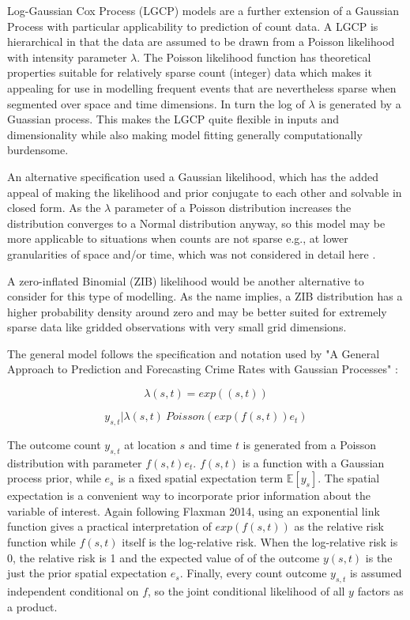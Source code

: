 \documentclass{article}
\begin{document}
Log-Gaussian Cox Process (LGCP) models are a further extension of a Gaussian Process with particular applicability to prediction of count data. A LGCP is hierarchical in that the data are assumed to be drawn from a Poisson likelihood with intensity parameter $\lambda$. The Poisson likelihood function has theoretical properties suitable for relatively sparse count (integer) data which makes it appealing for use in modelling frequent events that are nevertheless sparse when segmented over space and time dimensions. In turn the log of $\lambda$  is generated by a Guassian process\cite{teng_2017}. This makes the LGCP quite flexible in inputs and dimensionality while also making model fitting generally computationally burdensome. \par

An alternative specification used a Gaussian likelihood, which has the added appeal of making the likelihood and prior conjugate to each other and solvable in closed form. As the $\lambda$ parameter of a Poisson distribution increases the distribution converges to a Normal distribution anyway, so this model may be more applicable to situations when counts are not sparse e.g., at lower granularities of space and/or time, which was not considered in detail here .

A zero-inflated Binomial (ZIB) likelihood would be another alternative to consider for this type of modelling. As the name implies, a ZIB distribution has a higher probability density around zero and may be better suited for extremely sparse data like gridded observations with very small grid dimensions.

 The general model follows the specification and notation used by "A General Approach to Prediction and Forecasting Crime Rates with Gaussian Processes" \cite{flaxman_2014}: \par


$$\lambda(s,t) = exp((s,t))$$

$$ y_{s,t} | \lambda(s,t) ~ Poisson(exp(f(s,t))e_t) $$

The outcome count $y_{s,t}$ at location $s$ and time $t$ is generated from a Poisson distribution with parameter $f(s,t)e_t$. $f(s,t)$ is a function with a Gaussian process prior, while $e_s$ is a fixed spatial expectation term $\mathbb{E}[y_s]$. The spatial expectation is a convenient way to incorporate prior information about the variable of interest. Again following Flaxman 2014, using an exponential link function gives a practical interpretation of $exp(f(s,t))$ as the relative risk function while $f(s,t)$ itself is the log-relative risk. When the log-relative risk is 0, the relative risk is 1 and the expected value of of the outcome $y(s,t)$ is the just the prior spatial expectation $e_s$. Finally, every count outcome $y_{s,t}$ is assumed independent conditional on $f$, so the joint conditional likelihood of all $y$ factors as a product.
\end{document}
